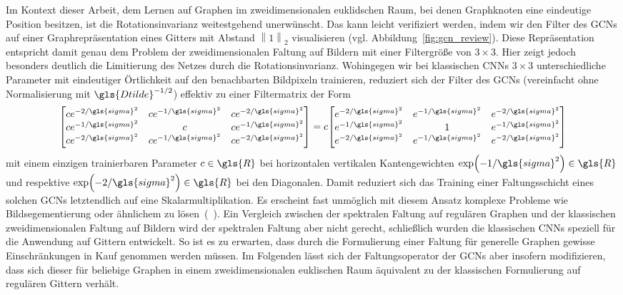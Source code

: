 Im Kontext dieser Arbeit, dem Lernen auf Graphen im zweidimensionalen euklidschen Raum, bei denen Graphknoten eine eindeutige Position besitzen, ist die Rotationsinvarianz weitestgehend unerwünscht.
Das kann leicht verifiziert werden, indem wir den Filter des \glspl{GCN} auf einer Graphrepräsentation eines Gitters mit Abstand $\left\|1\right\|_2$ visualisieren (vgl. Abbildung~\ref{fig:gcn_review}).
Diese Repräsentation entspricht damit genau dem Problem der zweidimensionalen Faltung auf Bildern mit einer Filtergröße von $3 \times 3$.
Hier zeigt jedoch besonders deutlich die Limitierung des Netzes durch die Rotationsinvarianz.
Wohingegen wir bei klassischen \glspl{CNN} $3 \times 3$ unterschiedliche Parameter mit eindeutiger Örtlichkeit auf den benachbarten Bildpixeln trainieren, reduziert sich der Filter des \glspl{GCN} (vereinfacht ohne Normalisierung mit $\gls{Dtilde}^{-1/2}$) effektiv zu einer Filtermatrix der Form
\begin{equation*}
  \begin{bmatrix}
    ce^{-2/\gls{sigma}^2} & ce^{-1/\gls{sigma}^2} & ce^{-2/\gls{sigma}^2}\\
    ce^{-1/\gls{sigma}^2} & c & ce^{-1/\gls{sigma}^2}\\
    ce^{-2/\gls{sigma}^2} & ce^{-1/\gls{sigma}^2} & ce^{-2/\gls{sigma}^2}
  \end{bmatrix} = c \begin{bmatrix}
    e^{-2/\gls{sigma}^2} & e^{-1/\gls{sigma}^2} & e^{-2/\gls{sigma}^2}\\
    e^{-1/\gls{sigma}^2} & 1 & e^{-1/\gls{sigma}^2}\\
    e^{-2/\gls{sigma}^2} & e^{-1/\gls{sigma}^2} & e^{-2/\gls{sigma}^2}
  \end{bmatrix}
\end{equation*}
mit einem einzigen trainierbaren Parameter $c \in \gls{R}$ bei horizontalen \bzw{} vertikalen Kantengewichten $\exp\left(-1/\gls{sigma}^2\right) \in \gls{R}$ und respektive $\exp\left(-2/\gls{sigma}^2\right) \in \gls{R}$ bei den Diagonalen.
Damit reduziert sich das Training einer Faltungsschicht eines solchen \glspl{GCN} letztendlich auf eine Skalarmultiplikation.
Es erscheint fast unmöglich mit diesem Ansatz komplexe Probleme wie \zB{} Bildsegementierung oder ähnlichem zu lösen~(\vgl{}~\cite{gcn_review}).
Ein Vergleich zwischen der spektralen Faltung auf regulären Graphen und der klassischen zweidimensionalen Faltung auf Bildern wird der spektralen Faltung aber nicht gerecht, schließlich wurden die klassischen \glspl{CNN} speziell für die Anwendung auf Gittern entwickelt.
So ist es zu erwarten, dass durch die Formulierung einer Faltung für generelle Graphen gewisse Einschränkungen in Kauf genommen werden müssen.
Im Folgenden lässt sich der Faltungsoperator der \glspl{GCN} aber insofern modifizieren, dass sich dieser für beliebige Graphen in einem zweidimensionalen euklischen Raum äquivalent zu der klassischen Formulierung auf regulären Gittern verhält.

